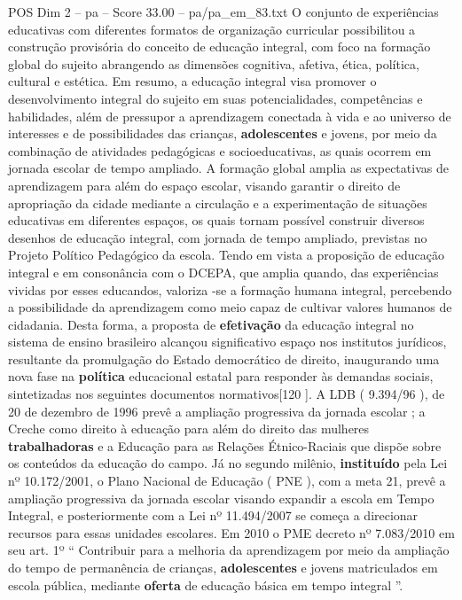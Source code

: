 \begin{textsample}{POS Dim 2 – pa – Score 33.00 – pa/pa\_em\_83.txt}
O conjunto de experiências educativas com diferentes formatos de organização curricular possibilitou a construção provisória do conceito de educação integral, com foco na formação global do sujeito abrangendo as dimensões cognitiva, afetiva, ética, política, cultural e estética.
Em resumo, a educação integral visa promover o desenvolvimento integral do sujeito em suas potencialidades, competências e habilidades, além de pressupor a aprendizagem conectada à vida e ao universo de interesses e de possibilidades das crianças, \textbf{adolescentes} e jovens, por meio da combinação de atividades pedagógicas e socioeducativas, as quais ocorrem em jornada escolar de tempo ampliado.
A formação global amplia as expectativas de aprendizagem para além do espaço escolar, visando garantir o direito de apropriação da cidade mediante a circulação e a experimentação de situações educativas em diferentes espaços, os quais tornam possível construir diversos desenhos de educação integral, com jornada de tempo ampliado, previstas no Projeto Político Pedagógico da escola.
Tendo em vista a proposição de educação integral e em consonância com o DCEPA, que amplia quando, das experiências vividas por esses educandos, valoriza -se a formação humana integral, percebendo a possibilidade da aprendizagem como meio capaz de cultivar valores humanos de cidadania.
Desta forma, a proposta de \textbf{efetivação} da educação integral no sistema de ensino brasileiro alcançou significativo espaço nos institutos jurídicos, resultante da promulgação do Estado democrático de direito, inaugurando uma nova fase na \textbf{política} educacional estatal para responder às demandas sociais, sintetizadas nos seguintes documentos normativos[120 ].
A LDB ( 9.394/96 ), de 20 de dezembro de 1996 prevê a ampliação progressiva da jornada escolar ; a Creche como direito à educação para além do direito das mulheres \textbf{trabalhadoras} e a Educação para as Relações Étnico-Raciais que dispõe sobre os conteúdos da educação do campo.
Já no segundo milênio, \textbf{instituído} pela Lei nº 10.172/2001, o Plano Nacional de Educação ( PNE ), com a meta 21, prevê a ampliação progressiva da jornada escolar visando expandir a escola em Tempo Integral, e posteriormente com a Lei nº 11.494/2007 se começa a direcionar recursos para essas unidades escolares.
Em 2010 o PME decreto nº 7.083/2010 em seu art. 1º “ Contribuir para a melhoria da aprendizagem por meio da ampliação do tempo de permanência de crianças, \textbf{adolescentes} e jovens matriculados em escola pública, mediante \textbf{oferta} de educação básica em tempo integral ”.

\end{textsample}
